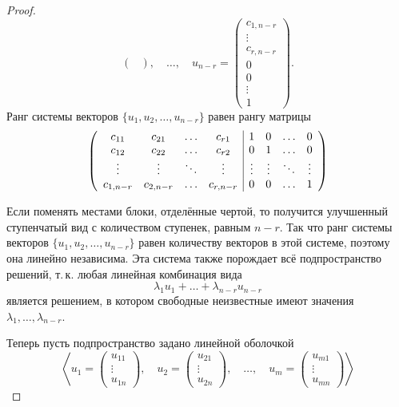 \begin{proof}
\[\begin{pmatrix}
        \end{pmatrix},\quad\ldots,\quad
        u_{n - r} = 
        \begin{pmatrix}
            c_{1, n - r}\\
            \vdots\\
            c_{r, n - r}\\
            0\\
            0\\
            \vdots\\
            1
        \end{pmatrix}.
    \]
    Ранг системы векторов $\{u_1, u_2, \ldots, u_{n - r}\}$ равен рангу матрицы
    \[
        \left(
            \begin{array}{c c c c | c c c c}
                c_{11} & c_{21} & \ldots & c_{r1} & 1 & 0 & \ldots & 0\\
                c_{12} & c_{22} & \ldots & c_{r2} & 0 & 1 & \ldots & 0\\
                \vdots & \vdots & \ddots & \vdots & \vdots & \vdots & \ddots & \vdots\\
                c_{1, n - r} & c_{2, n - r} & \ldots & c_{r, n - r} & 0 & 0 & \ldots & 1
            \end{array}
        \right)
    \]

    Если поменять местами блоки, отделённые чертой, то получится улучшенный ступенчатый вид с количеством ступенек, равным $n - r$. Так что ранг системы векторов $\{u_1, u_2, \ldots, u_{n - r}\}$ равен количеству векторов в этой системе, поэтому она линейно независима. Эта система также порождает всё подпространство решений, т.\,к. любая линейная комбинация вида
    \[
        \lambda_1u_1 + \ldots + \lambda_{n - r}u_{n - r}
    \]
    является решением, в котором свободные неизвестные имеют значения $\lambda_1, \ldots, \lambda_{n - r}$.

    Теперь пусть подпространство задано линейной оболочкой
    \[
        \left\langle
        u_1 = 
        \begin{pmatrix}
            u_{11}\\
            \vdots\\
            u_{1n}
        \end{pmatrix},\quad
        u_2 = 
        \begin{pmatrix}
            u_{21}\\
            \vdots\\
            u_{2n}
        \end{pmatrix},\quad\ldots,\quad
        u_m = 
        \begin{pmatrix}
            u_{m1}\\
            \vdots\\
            u_{mn}
        \end{pmatrix}
        \right\rangle
    \]


\end{proof}
